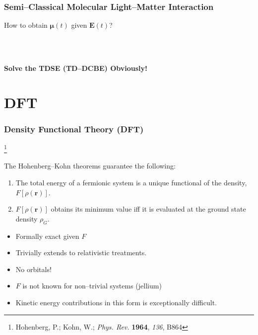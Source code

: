 \documentclass{beamer}
\newcommand\blfootnote[1]{%
  \begingroup
  \renewcommand\thefootnote{}\footnote{#1}%
  \addtocounter{footnote}{-1}%
  \endgroup
}
\begin{document}
\begin{frame}
\frametitle{Semi--Classical Molecular Light--Matter Interaction}
\begin{center} 
\LARGE How to obtain $\boldsymbol{\mu}(t)$ given $\mathbf{E}(t)$?
\end{center}
~\\
~\\
\begin{center}
\LARGE \bf
Solve the TDSE (TD--DCBE) Obviously! 
\end{center}
\end{frame}

\section{DFT}

\begin{frame}
\frametitle{Density Functional Theory (DFT)}
\blfootnote{Hohenberg, P.; Kohn, W.; \emph{Phys. Rev.} \textbf{1964}, \emph{136}, B864}

The Hohenberg--Kohn theorems guarantee the following:
\begin{enumerate}
  \item The total energy of a fermionic system is a unique functional of the density, $F[\rho(\mathbf{r})]$.
  \item $F[\rho(\mathbf{r})]$ obtains its minimum value iff it is evaluated at the ground state density $\rho_G$.
\end{enumerate}

\begin{itemize}
  \color{green}
  \item Formally exact given $F$
  \item Trivially extends to relativistic treatments.
  \item No orbitals!
\end{itemize}

\begin{itemize}
  \color{red}
  \item $F$ is not known for non--trivial systems (jellium)
  \item Kinetic energy contributions in this form is exceptionally difficult.
\end{itemize}

\end{frame}
\end{document}
